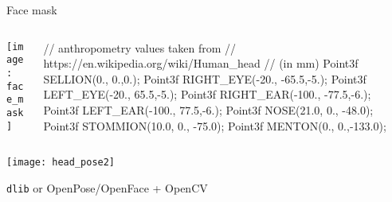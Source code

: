 \documentclass[compress]{beamer}
\begin{document}

\begin{frame}[fragile]{Face mask}

    \begin{columns}
        \begin{column}{0.4\linewidth}
            \begin{center}
                \texttt{[image: face\_mask]}
            \end{center}
        \end{column}
        \begin{column}{0.6\linewidth}
\begin{cppcode}
// anthropometry values taken from
// https://en.wikipedia.org/wiki/Human_head
// (in mm)
Point3f SELLION(0., 0.,0.);
Point3f RIGHT_EYE(-20., -65.5,-5.);
Point3f LEFT_EYE(-20., 65.5,-5.);
Point3f RIGHT_EAR(-100., -77.5,-6.);
Point3f LEFT_EAR(-100., 77.5,-6.);
Point3f NOSE(21.0, 0., -48.0);
Point3f STOMMION(10.0, 0., -75.0);
Point3f MENTON(0., 0.,-133.0);
\end{cppcode}
        \end{column}
    \end{columns}
\end{frame}


\begin{frame}[plain]{}
    \begin{center}
        \texttt{[image: head\_pose2]}

    {\tt dlib} or OpenPose/OpenFace + OpenCV

    \end{center}
\end{frame}
\end{document}
